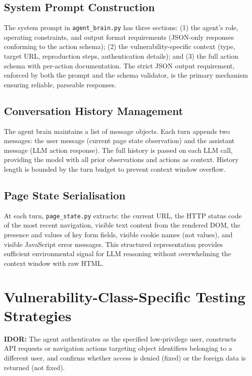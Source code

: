 \subsection{System Prompt Construction}

The system prompt in \texttt{agent\_brain.py} has three sections: (1) the agent's role, operating constraints, and output format requirements (JSON-only responses conforming to the action schema); (2) the vulnerability-specific context (type, target URL, reproduction steps, authentication details); and (3) the full action schema with per-action documentation. The strict JSON output requirement, enforced by both the prompt and the schema validator, is the primary mechanism ensuring reliable, parseable responses.

\subsection{Conversation History Management}

The agent brain maintains a list of message objects. Each turn appends two messages: the user message (current page state observation) and the assistant message (LLM action response). The full history is passed on each LLM call, providing the model with all prior observations and actions as context. History length is bounded by the turn budget to prevent context window overflow.

\subsection{Page State Serialisation}

At each turn, \texttt{page\_state.py} extracts: the current URL, the HTTP status code of the most recent navigation, visible text content from the rendered DOM, the presence and values of key form fields, visible cookie names (not values), and visible JavaScript error messages. This structured representation provides sufficient environmental signal for LLM reasoning without overwhelming the context window with raw HTML.

\section{Vulnerability-Class-Specific Testing Strategies}

\textbf{IDOR:} The agent authenticates as the specified low-privilege user, constructs API requests or navigation actions targeting object identifiers belonging to a different user, and confirms whether access is denied (fixed) or the foreign data is returned (not fixed).

